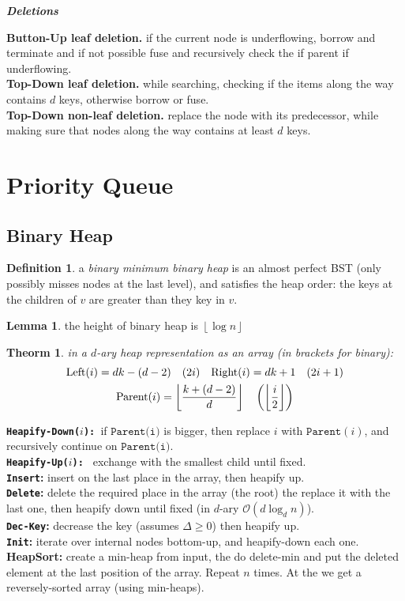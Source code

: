 \documentclass[]{article}
\newcommand\compactsubsection[1]        {\vspace{-10pt}\subsection{#1}\vspace{-5pt}}
\newcommand\compactsection   [1]        {\vspace{-10pt}\section{#1}\vspace{-5pt}}
\newcommand\subsectionrightaftersection {\vspace{10pt}}
\newcommand\oc    {\mathcal{O}}
\newcommand\rf    {\right\rfloor}
\newcommand\lf    {\left\lfloor}
\newcommand\floor [1] {\lf #1 \rf}
\newcommand\logn      {\log n}
\newcommand\cl [1]    {\left ( #1 \right )}
\newtheorem{Theorem}{Theorm}
\theoremstyle{definition}
\newtheorem{Definition}{Definition}
\newtheorem{Lemma}{Lemma}
\newcommand\theo  [1] {\begin{Theorem}#1\end{Theorem}}
\newcommand\defi  [1] {\begin{Definition}#1\end{Definition}}
\newcommand\lem   [1] {\begin{Lemma}#1\end{Lemma}}
\begin{document}
\begin{multicols}{4}
				\quad\textbf{\textit{Deletions}}
				
					\textbf{Button-Up leaf deletion. }if the current node is underflowing, borrow and terminate and if not possible fuse and recursively check the if parent if underflowing. \\
					\textbf{Top-Down leaf deletion. }while searching, checking if the items along the way contains $d$ keys, otherwise borrow or fuse. \\
					\textbf{Top-Down non-leaf deletion. }replace the node with its predecessor, while making sure that nodes along the way contains at least $d$ keys. 
		
		\compactsection{Priority Queue}\subsectionrightaftersection
			\compactsubsection{Binary Heap}
				\defi{a \textit{binary minimum binary heap} is an almost perfect BST (only possibly misses nodes at the last level), and satisfies the heap order: the keys at the children of $v$ are greater than they key in $v$. }
				\lem{the height of binary heap is $\floor{\logn}$}
				\theo{in a $d$-ary heap representation as an array (in brackets for binary): 
				\vspace{-10pt}\begin{gather*}
					\textstyle \text{\rm Left}(i) = dk - (d-2) \quad (2i) \quad \text{\rm Right}(i) = dk + 1 \quad (2i + 1) \\ 
					\text{\rm Parent}(i) = \floor{\frac{k + (d - 2)}{d}} \quad\cl{\floor{\frac{i}{2}}}
				\end{gather*}\vspace{-14pt}
				} %
				\textbf{\texttt{Heapify-Down($i$): }}if $\texttt{Parent(i)}$ is bigger, then replace $i$ with $\texttt{Parent}(i)$, and recursively continue on $\texttt{Parent(i)}$. \\
				\textbf{\texttt{Heapify-Up($i$): }} exchange with the smallest child until fixed. \\
				\textbf{\texttt{Insert}: }insert on the last place in the array, then heapify up. \\ 
				\textbf{\texttt{Delete}: }delete the required place in the array (the root) the replace it with the last one, then heapify down until fixed (in $d$-ary $\oc(d\log_dn)$). \\
				\textbf{\texttt{Dec-Key}: }decrease the key (assumes $\Delta \ge 0$) then heapify up. \\
				\textbf{\texttt{Init}: }iterate over internal nodes bottom-up, and heapify-down each one. \\
				\textbf{HeapSort: }create a min-heap from input, the do delete-min and put the deleted element at the last position of the array. Repeat $n$ times. At the we get a reversely-sorted array (using min-heaps). 
			

\end{multicols}
\end{document}
